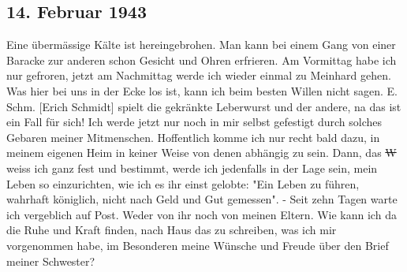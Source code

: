 \subsection{14. Februar 1943}

Eine \"{u}berm\"{a}ssige K\"{a}lte ist hereingebrohen.
Man kann bei einem Gang von einer Baracke zur anderen schon Gesicht und Ohren erfrieren.
Am Vormittag habe ich nur gefroren, jetzt am Nachmittag werde ich wieder einmal zu Meinhard gehen. Was hier bei uns in der Ecke los ist, kann ich beim besten Willen nicht sagen. E. Schm. {\color{red} [Erich Schmidt] } spielt die gekr\"{a}nkte Leberwurst und der andere, na das ist ein Fall f\"{u}r sich!
Ich werde jetzt nur noch in mir selbst gefestigt durch solches Gebaren meiner Mitmenschen.
Hoffentlich komme ich nur recht bald dazu, in meinem eigenen Heim in keiner Weise von denen abh\"{a}ngig zu sein.
Dann, das \st{W} weiss ich ganz fest und bestimmt, werde ich jedenfalls in der Lage sein, mein Leben so einzurichten, wie ich es ihr einst gelobte: "Ein Leben zu f\"{u}hren, wahrhaft k\"{o}niglich, nicht nach Geld und Gut gemessen".
- Seit zehn Tagen warte ich vergeblich auf Post.
Weder von ihr noch von meinen Eltern.
Wie kann ich da die Ruhe und Kraft finden, nach Haus das zu schreiben, was ich mir vorgenommen habe, im Besonderen meine W\"{u}nsche und Freude \"{u}ber den Brief meiner Schwester?

\clearpage
